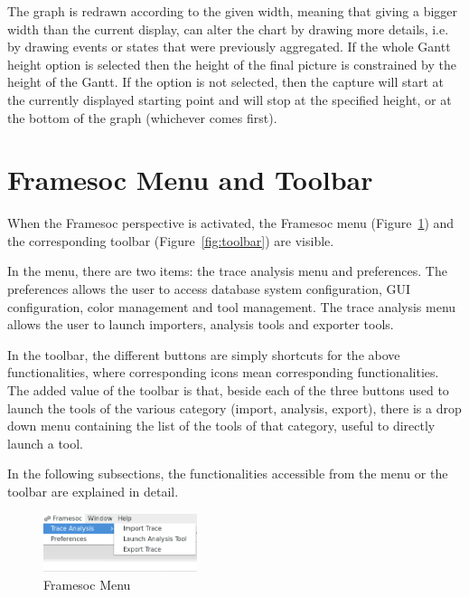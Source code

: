 \documentclass[twoside]{article}
\begin{document}
\begin{sloppypar}
The graph is redrawn according to the given width, meaning that giving a bigger width than the current display, can alter the chart by drawing more details, i.e. by drawing events or states that were previously aggregated.
If the whole Gantt height option is selected then the height of the final picture is constrained by the height of the Gantt. 
If the option is not selected, then the capture will start at the currently displayed starting point and will stop at the specified height, or at the bottom of the graph (whichever comes first).

\section{Framesoc Menu and Toolbar}
\label{sec:menu}

When the Framesoc perspective is activated, the Framesoc menu (Figure~\ref{fig:menu}) and the corresponding toolbar (Figure~\ref{fig:toolbar}) are visible. 

In the menu, there are two items: the trace analysis menu and preferences.
The preferences allows the user to access database system configuration, GUI configuration, color management and tool management.
The trace analysis menu allows the user to launch importers, analysis tools and exporter tools.

In the toolbar, the different buttons are simply shortcuts for the above functionalities, where corresponding icons mean corresponding functionalities.
The added value of the toolbar is that, beside each of the three buttons used to launch the tools of the various category (import, analysis, export), there is a drop down menu containing the list of the tools of that category, useful to directly launch a tool.

In the following subsections, the functionalities accessible from the menu or the toolbar are explained in detail.

\begin{figure}[h!]
  \centering

    \includegraphics[width=0.4\textwidth]{images/menu.png}
  \caption{Framesoc Menu}
  \label{fig:menu}
\end{figure}


\end{sloppypar}
\end{document}
